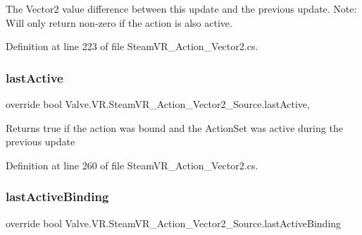 The Vector2 value difference between this update and the previous update. Note\+: Will only return non-\/zero if the action is also active. 



Definition at line 223 of file Steam\+V\+R\+\_\+\+Action\+\_\+\+Vector2.\+cs.

\mbox{\label{class_valve_1_1_v_r_1_1_steam_v_r___action___vector2___source_aabe8a5fe1698bf1bfc323f4f4ee1662c}} 
\subsubsection{\texorpdfstring{lastActive}{lastActive}}
{\footnotesize\ttfamily override bool Valve.\+V\+R.\+Steam\+V\+R\+\_\+\+Action\+\_\+\+Vector2\+\_\+\+Source.\+last\+Active\hspace{0.3cm}{\ttfamily [get]}, {}}



Returns true if the action was bound and the Action\+Set was active during the previous update 



Definition at line 260 of file Steam\+V\+R\+\_\+\+Action\+\_\+\+Vector2.\+cs.

\mbox{\label{class_valve_1_1_v_r_1_1_steam_v_r___action___vector2___source_a2d4c806995d691a67313e46853e19f92}} 
\subsubsection{\texorpdfstring{lastActiveBinding}{lastActiveBinding}}
{\footnotesize\ttfamily override bool Valve.\+V\+R.\+Steam\+V\+R\+\_\+\+Action\+\_\+\+Vector2\+\_\+\+Source.\+last\+Active\+Binding\hspace{0.3cm}{\ttfamily [get]}}



